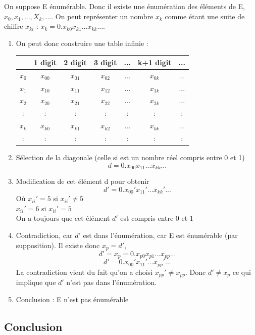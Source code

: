 On suppose E énumérable. Donc il existe une énumération des éléments de E,
$x_0, x_1, ...,X_k,...$. On peut représenter un nombre $x_k$ comme étant une
suite de chiffre $x_{ki}$ : $x_k = 0.x_{k0}x_{k1}...x_{kk}...$.

\begin{enumerate}
	\item On peut donc construire une table infinie : \\
		\begin{tabular}{|c||c|c|c|c|c|c|}
			\hline
			& 1 digit & 2 digit & 3 digit & ... & k+1 digit & ... \\
			\hline
			$x_0$ & $x_{00}$ & $x_{01}$ & $x_{02}$ & ... & $x_{0k}$ & ... \\
			$x_1$ & $x_{10}$ & $x_{11}$ & $x_{12}$ & ... & $x_{1k}$ & ... \\
			$x_2$ & $x_{20}$ & $x_{21}$ & $x_{22}$ & ... & $x_{2k}$ & ... \\
			: & : &:& : & : & : &:\\
			$x_k$ & $x_{k0}$ & $x_{k1}$ & $x_{k2}$ & ... & $x_{kk}$ & ... \\
			: & : &:& : & : & : &:\\
			\hline
		\end{tabular}
	\item Sélection de la diagonale (celle si est un nombre réel compris
		entre 0 et 1)
		\[ d=0.x_{00}x_{11}...x_{kk}... \]	
	\item Modification de cet élément d pour obtenir
		\[ d'=0.x_{00}'x_{11}'...x_{kk}'... \]	
		Où $x_{ii}'=5$ si $x_{ii}'\neq 5$ \\
		$x_{ii}'=6$ si $x_{ii}'= 5$ \\
		On a toujours que cet élément $d'$ est compris entre 0 et 1
	\item Contradiction, car $d'$ est dans l'énumération, car E est
		énumérable (par supposition). Il existe donc $x_p=d'$, 
		\[ d'=x_p=0.x_{p0}x_{p1}...x_{pp}... \]	
		\[ d'=0.x_{00}'x_{11}'...x_{pp}'... \]	
		La contradiction vient du fait qu'on a choisi $x_{pp}' \neq
	       	x_{pp}$. Donc $d' \neq x_p$ ce qui implique que $d'$ n'est pas
		dans l'énumération.
	\item Conclusion : E n'est pas énumérable

\end{enumerate}

\subsection{Conclusion}

